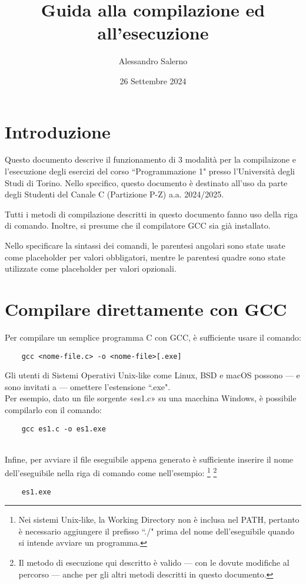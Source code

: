 \documentclass{article}
\title{Guida alla compilazione ed all'esecuzione}
\author{Alessandro Salerno}
\date{26 Settembre 2024}
\begin{document}
\maketitle

\section{Introduzione}

Questo documento descrive il funzionamento di 3 modalità per la compilaizone e l'esecuzione degli esercizi del corso ``Programmazione 1" presso l'Università degli Studi di Torino. Nello specifico, questo documento è destinato all'uso da parte degli Studenti del Canale C (Partizione P-Z) a.a. 2024/2025. \par
Tutti i metodi di compilazione descritti in questo documento fanno uso della riga di comando. Inoltre, si presume che il compilatore GCC sia già installato.  \par
Nello specificare la sintassi dei comandi, le parentesi angolari sono state usate come placeholder per valori obbligatori, mentre le parentesi quadre sono state utilizzate come placeholder per valori opzionali.

\section{Compilare direttamente con GCC}
Per compilare un semplice programma C con GCC, è sufficiente usare il comando:
\begin{verbatim}
    gcc <nome-file.c> -o <nome-file>[.exe]
\end{verbatim}
Gli utenti di Sistemi Operativi Unix-like come Linux, BSD e macOS possono — e sono invitati a — omettere l'estensione ``.exe". \\ 
Per esempio, dato un file sorgente «es1.c» su una macchina Windows, è possibile compilarlo con il comando:
\begin{verbatim}
    gcc es1.c -o es1.exe
\end{verbatim} \\
Infine, per avviare il file eseguibile appena generato è sufficiente inserire il nome dell'eseguibile nella riga di comando come nell'esempio:
\footnote{Nei sistemi Unix-like, la Working Directory non è inclusa nel PATH, pertanto è necessario aggiungere il prefisso ``./" prima del nome dell'eseguibile quando si intende avviare un programma.}
\footnote{Il metodo di esecuzione qui descritto è valido — con le dovute modifiche al percorso —  anche per gli altri metodi descritti in questo documento.}
\begin{verbatim}
    es1.exe
\end{verbatim}
\end{document}
